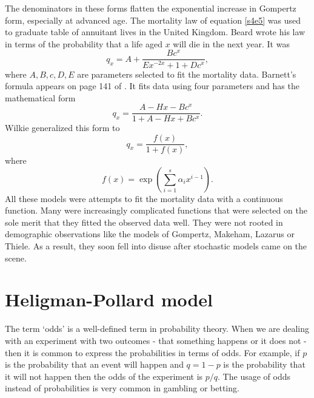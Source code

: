 \documentclass{article}
\numberwithin{equation}{section}
\begin{document}
The denominators in these forms flatten the exponential increase in Gompertz
form, especially at advanced age. The mortality law of equation \eqref{s4e5}
was used to graduate table of annuitant lives in the United Kingdom. Beard
\cite{beard1971some} wrote his law in terms of the probability that a life 
aged $x$ will die in the next year. It was
\begin{equation}\label{s4e7}
q_x = A + \frac{Bc^x}{Ex^{-2x} + 1 + Dc^x},
\end{equation}
where $A, B, c, D, E$ are parameters selected to fit the mortality data.
Barnett's formula appears on page 141 of \cite{joint1974considerations}. It
fits data using four parameters and has the mathematical form
\begin{equation}\label{s4e8}
q_x = \frac{A - Hx - Bc^x}{1 + A - Hx + Bc^x}.
\end{equation}
Wilkie \cite{wilkie1976international} generalized this form to
\begin{equation}\label{s4e9}
q_x = \frac{f(x)}{1 + f(x)},
\end{equation}
where
\begin{equation}\label{s4e10}
f(x) = \exp\left(\sum_{i=1}^s\alpha_i x^{i-1}\right).
\end{equation}
All these models were attempts to fit the mortality data with a continuous 
function. Many were increasingly complicated functions that were selected on
the sole merit that they fitted the observed data well. They were not rooted in 
demographic observations like the models of Gompertz, Makeham, Lazarus or 
Thiele. As a result, they soon fell into disuse after stochastic models came on
the scene.

\section{Heligman-Pollard model}\label{s5}
The term `odds' is a well-defined term in probability theory. When we are 
dealing with an experiment with two outcomes - that something happens or 
it does not - then it is common to express the probabilities in terms of odds. 
For example, if $p$ is the probability that an event will happen and $q = 1 - p$
is the probability that it will not happen then the odds of the experiment is 
$p/q$. The usage of odds instead of probabilities is very common in gambling or
betting.
\end{document}
